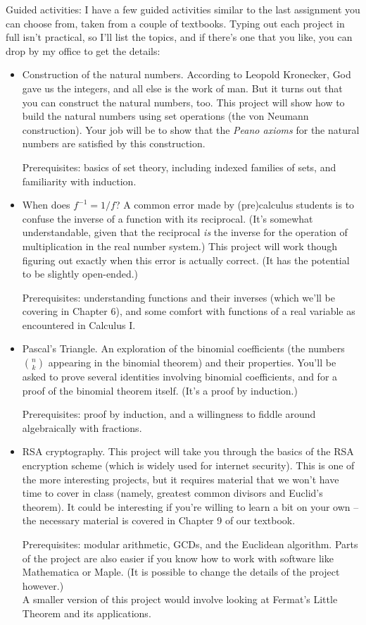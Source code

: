 \documentclass[letterpaper,12pt]{article}
\begin{document}
Guided activities: I have a few guided activities similar to the last assignment you can choose from, taken from a couple of textbooks. Typing out each project in full isn't practical, so I'll list the topics, and if there's one that you like, you can drop by my office to get the details:
\begin{itemize}
\item Construction of the natural numbers. According to Leopold Kronecker, God gave us the integers, and all else is the work of man. But it turns out that you can construct the natural numbers, too. This project will show how to build the natural numbers using set operations (the von Neumann construction). Your job will be to show that the {\em Peano axioms} for the natural numbers are satisfied by this construction.

Prerequisites: basics of set theory, including indexed families of sets, and familiarity with induction.

\item When does $f^{-1}=1/f$? A common error made by (pre)calculus students is to confuse the inverse of a function with its reciprocal. (It's somewhat understandable, given that the reciprocal {\em is} the inverse for the operation of multiplication in the real number system.) This project will work though figuring out exactly when this error is actually correct. (It has the potential to be slightly open-ended.)

Prerequisites: understanding functions and their inverses (which we'll be covering in Chapter 6), and some comfort with functions of a real variable as encountered in Calculus I.

\item Pascal's Triangle. An exploration of the binomial coefficients (the numbers $\binom{n}{k}$ appearing in the binomial theorem) and their properties. You'll be asked to prove several identities involving binomial coefficients, and for a proof of the binomial theorem itself. (It's a proof by induction.)

Prerequisites: proof by induction, and a willingness to fiddle around algebraically with fractions.

\item RSA cryptography. This project will take you through the basics of the RSA encryption scheme (which is widely used for internet security). This is one of the more interesting projects, but it requires material that we won't have time to cover in class (namely, greatest common divisors and Euclid's theorem). It could be interesting if you're willing to learn a bit on your own -- the necessary material is covered in Chapter 9 of our textbook.

Prerequisites: modular arithmetic, GCDs, and the Euclidean algorithm. Parts of the project are also easier if you know how to work with software like Mathematica or Maple. (It is possible to change the details of the project however.)\\
A smaller version of this project would involve looking at Fermat's Little Theorem and its applications.
\end{itemize}
\end{document}

